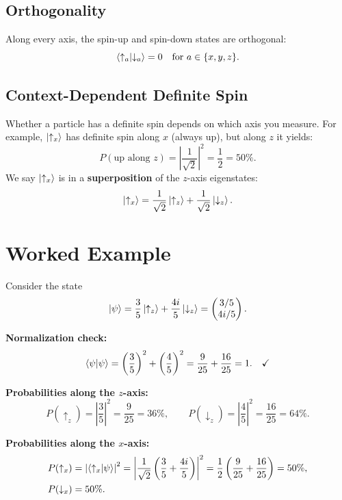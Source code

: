 \documentclass[11pt,a4paper]{article}
\theoremstyle{definition}
\theoremstyle{plain}
\theoremstyle{remark}
\begin{document}
\subsection{Orthogonality}

Along every axis, the spin-up and spin-down states are orthogonal:
\[
    \braket{\uparrow_a}{\downarrow_a} = 0 \quad \text{for } a \in \{x, y, z\}.
\]

\subsection{Context-Dependent Definite Spin}

Whether a particle has a definite spin depends on which axis you measure. For example, $\ket{\uparrow_x}$ has definite spin along $x$ (always up), but along $z$ it yields:
\[
    P(\text{up along } z) = \left|\frac{1}{\sqrt{2}}\right|^2 = \frac{1}{2} = 50\%.
\]
We say $\ket{\uparrow_x}$ is in a \textbf{superposition} of the $z$-axis eigenstates:
\[
    \ket{\uparrow_x} = \frac{1}{\sqrt{2}}\ket{\uparrow_z} + \frac{1}{\sqrt{2}}\ket{\downarrow_z}.
\]

\section{Worked Example}

Consider the state
\[
    \ket{\psi} = \frac{3}{5}\ket{\uparrow_z} + \frac{4i}{5}\ket{\downarrow_z} = \begin{pmatrix} 3/5 \\ 4i/5 \end{pmatrix}.
\]

\textbf{Normalization check:}
\[
    \braket{\psi}{\psi} = \left(\frac{3}{5}\right)^2 + \left(\frac{4}{5}\right)^2 = \frac{9}{25} + \frac{16}{25} = 1. \quad \checkmark
\]

\textbf{Probabilities along the $z$-axis:}
\[
    P(\uparrow_z) = \left|\frac{3}{5}\right|^2 = \frac{9}{25} = 36\%, \qquad
    P(\downarrow_z) = \left|\frac{4}{5}\right|^2 = \frac{16}{25} = 64\%.
\]

\textbf{Probabilities along the $x$-axis:}
\begin{align}
    P(\uparrow_x) &= \left|\braket{\uparrow_x}{\psi}\right|^2 = \left|\frac{1}{\sqrt{2}}\left(\frac{3}{5} + \frac{4i}{5}\right)\right|^2 = \frac{1}{2}\left(\frac{9}{25} + \frac{16}{25}\right) = 50\%, \\
    P(\downarrow_x) &= 50\%.
\end{align}
\end{document}

